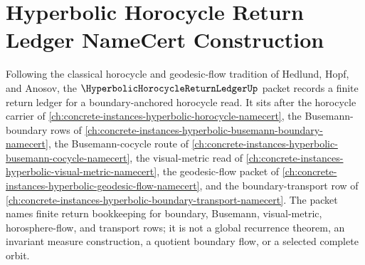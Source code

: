 \chapter{Hyperbolic Horocycle Return Ledger NameCert Construction}
\label{ch:concrete-instances-hyperbolic-horocycle-return-ledger-namecert}

Following the classical horocycle and geodesic-flow tradition of Hedlund, Hopf, and Anosov, the $\HyperbolicHorocycleReturnLedgerUp$ packet records a finite return ledger for a boundary-anchored horocycle read. It sits after the horocycle carrier of \autoref{ch:concrete-instances-hyperbolic-horocycle-namecert}, the Busemann-boundary rows of \autoref{ch:concrete-instances-hyperbolic-busemann-boundary-namecert}, the Busemann-cocycle route of \autoref{ch:concrete-instances-hyperbolic-busemann-cocycle-namecert}, the visual-metric read of \autoref{ch:concrete-instances-hyperbolic-visual-metric-namecert}, the geodesic-flow packet of \autoref{ch:concrete-instances-hyperbolic-geodesic-flow-namecert}, and the boundary-transport row of \autoref{ch:concrete-instances-hyperbolic-boundary-transport-namecert}. The packet names finite return bookkeeping for boundary, Busemann, visual-metric, horosphere-flow, and transport rows; it is not a global recurrence theorem, an invariant measure construction, a quotient boundary flow, or a selected complete orbit.

